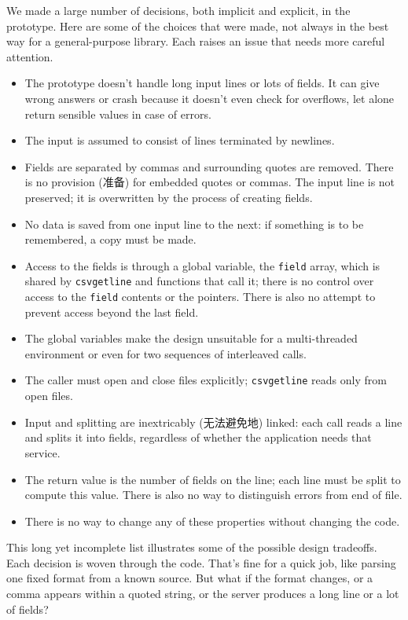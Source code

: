We made a large number of decisions, both implicit and explicit, in the
prototype. Here are some of the choices that were made, not always in the
best way for a general-purpose library. Each raises an issue that needs
more careful attention.
\begin{itemize}
    \item The prototype doesn't handle long input lines or lots of fields.
        It can give wrong answers or crash because it doesn't even check
        for overflows, let alone return sensible values in case of errors.
    \item The input is assumed to consist of lines terminated by newlines.
    \item Fields are separated by commas and surrounding quotes are
        removed. There is no provision (准备) for embedded quotes or
        commas.  The input line is not preserved; it is overwritten by the
        process of creating fields.
    \item No data is saved from one input line to the next: if something is
        to be remembered, a copy must be made.
    \item Access to the fields is through a global variable, the
        \verb'field' array, which is shared by \verb'csvgetline' and
        functions that call it; there is no control over access to the
        \verb'field' contents or the pointers. There is also no attempt to
        prevent access beyond the last field.
    \item The global variables make the design unsuitable for a
        multi-threaded environment or even for two sequences of interleaved
        calls.
    \item The caller must open and close files explicitly;
        \verb'csvgetline' reads only from open files.
    \item Input and splitting are inextricably (无法避免地) linked: each
        call reads a line and splits it into fields, regardless of whether
        the application needs that service.
    \item The return value is the number of fields on the line; each line
        must be split to compute this value. There is also no way to
        distinguish errors from end of file.
    \item There is no way to change any of these properties without
        changing the code.
\end{itemize}

This long yet incomplete list illustrates some of the possible design
tradeoffs.  Each decision is woven through the code. That's fine for a
quick job, like parsing one fixed format from a known source. But what if
the format changes, or a comma appears within a quoted string, or the
server produces a long line or a lot of fields?

